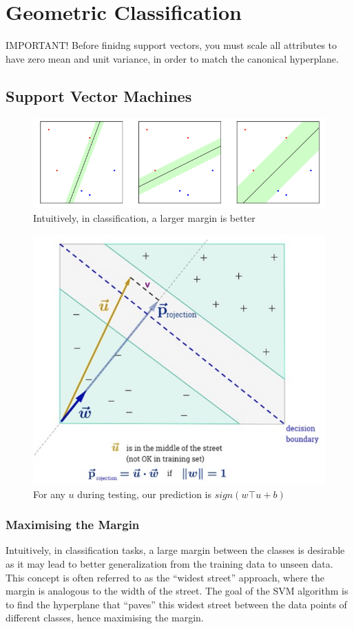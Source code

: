 \chapter{Geometric Classification}
\begin{commentbox}{IMPORTANT!}
    Before finidng support vectors, you must scale all attributes to have zero mean and unit variance, in order to match the canonical hyperplane. 
\end{commentbox}
\section{Support Vector Machines}
\begin{figure}[H]
    \centering
    \includegraphics[width=0.75\linewidth]{img/svg_max_margin.png}
    \caption{Intuitively, in classification, a larger margin is better}
    \label{fig:svm_max_margin-label}
\end{figure}
\begin{figure}[H]
    \centering
    \includegraphics[width=0.5\linewidth]{img/middlestreet.png}
    \caption{For any $u$ during testing, our prediction is $sign(w\top u+ b)$}
    \label{fig:middlestreet-label}
\end{figure}

\subsection{Maximising the Margin}
\label{subsec:maximising_margin}

Intuitively, in classification tasks, a large margin between the classes is desirable as it may lead to better generalization from the training data to unseen data. This concept is often referred to as the ``widest street'' approach, where the margin is analogous to the width of the street. The goal of the SVM algorithm is to find the hyperplane that ``paves'' this widest street between the data points of different classes, hence maximising the margin.


